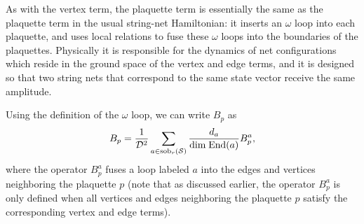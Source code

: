 As with the vertex term, the plaquette term is essentially the same as the plaquette term in the usual string-net Hamiltonian: 
it inserts an $\omega$ loop 
into each plaquette, and uses local relations to fuse these $\omega$ loops into the boundaries of the plaquettes. 
Physically it is responsible for the dynamics of net configurations which reside in the ground space of the vertex and edge terms, 
and it is designed so that two string nets that correspond to the same state vector receive the same amplitude. 

Using the definition of the $\omega$ loop, we can write $B_p$ as 
\begin{align} \label{plaquette_term_defn}
B_p =\frac{1}{\mathcal{D}^2} \sum_{a \in \text{sob}_r(\mathcal{S})} \frac{d_a}{\text{dim} \; \text{End}(a)} B^a_p, 
\end{align}
where the operator $B_p^a$ fuses a loop labeled $a$ into the edges and vertices neighboring the plaquette $p$ (note that 
as discussed earlier, the operator $B_p^a$ is only defined when all vertices and edges neighboring the plaquette $p$ satisfy the corresponding vertex and edge terms).

